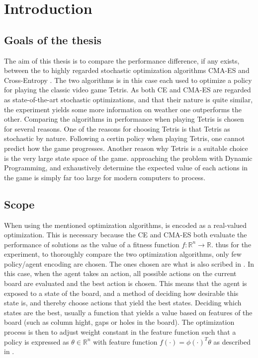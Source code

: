\section{Introduction}

\subsection{Goals of the thesis}

The aim of this thesis is to compare the performance 
difference, if any exists, between the to highly regarded 
stochastic optimization algorithms CMA-ES \citep{hansen2011} and Cross-Entropy
\citep{cetut:14}.
The two algorithms is in this case each used to optimize 
a policy for playing the classic video game Tetris. As both CE and
CMA-ES are regarded as state-of-the-art stochastic optimizations, and that
their nature is quite similar, the experiment yields some more information
on weather one outperforms the other. Comparing the algorithms in performance
when playing Tetris is chosen for several reasons. One of the reasons for 
choosing Tetris is that Tetris as stochastic by nature. Following a certin 
policy when playing Tetris, one cannot predict how the game progresses. Another
reason why Tetris is a suitable choice is the very large state space of the game.
approaching the problem with Dynamic Programming, and exhaustively 
determine the expected value of each actions in the game is simply far too
large for modern computers to process.



\subsection{Scope}

When using the mentioned optimization algorithms,
is encoded as a real-valued optimization. This is necessary
because the CE and CMA-ES both evaluate the performance of solutions
as the value of a fitness function $f : \mathbb{R}^n \rightarrow \mathbb{R}$.
thus for the experiment, to thoroughly compare the two optimization algorithms,
only few policy/agent encoding are chosen. The ones chosen are
what is also scribed in \citep{scherrer2015}. In this case, 
when the agent takes an action, all possible actions on the current 
board are evaluated and the best action is chosen. This means that the agent 
is exposed to a state of the board, and a method of deciding how desirable 
this state is, and thereby choose actions that yield the best states. 
Deciding which states are the best, usually a function 
that yields a value based on features of the board 
(such as column hight, gaps or holes in the board). The optimization process
is then to adjust weight constant in the feature function such that 
a policy is expressed as $\theta \in \mathbb{R}^n$ with feature 
function $ f( \cdot ) = \phi ( \cdot )^{T}\theta$ as
described in \citep{scherrer2015}.\\

